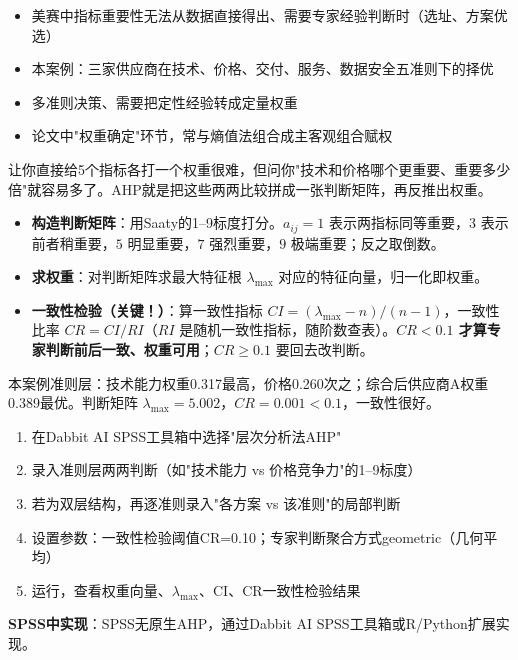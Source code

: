 \begin{algoscene}
\begin{itemize}
    \item 美赛中指标重要性无法从数据直接得出、需要专家经验判断时（选址、方案优选）
    \item 本案例：三家供应商在技术、价格、交付、服务、数据安全五准则下的择优
    \item 多准则决策、需要把定性经验转成定量权重
    \item 论文中"权重确定"环节，常与熵值法组合成主客观组合赋权
\end{itemize}
\end{algoscene}

\begin{algoprinciple}
让你直接给5个指标各打一个权重很难，但问你"技术和价格哪个更重要、重要多少倍"就容易多了。AHP就是把这些两两比较拼成一张判断矩阵，再反推出权重。

\begin{itemize}
    \item \textbf{构造判断矩阵}：用Saaty的1--9标度打分。$a_{ij}=1$ 表示两指标同等重要，$3$ 表示前者稍重要，$5$ 明显重要，$7$ 强烈重要，$9$ 极端重要；反之取倒数。
    \item \textbf{求权重}：对判断矩阵求最大特征根 $\lambda_{\max}$ 对应的特征向量，归一化即权重。
    \item \textbf{一致性检验（关键！）}：算一致性指标 $CI=(\lambda_{\max}-n)/(n-1)$，一致性比率 $CR=CI/RI$（$RI$ 是随机一致性指标，随阶数查表）。\textbf{$CR<0.1$ 才算专家判断前后一致、权重可用}；$CR\geq0.1$ 要回去改判断。
\end{itemize}

本案例准则层：技术能力权重0.317最高，价格0.260次之；综合后供应商A权重0.389最优。判断矩阵 $\lambda_{\max}=5.002$，$CR=0.001<0.1$，一致性很好。
\end{algoprinciple}

\begin{algosposs}
\begin{enumerate}
    \item 在Dabbit AI SPSS工具箱中选择"层次分析法AHP"
    \item 录入准则层两两判断（如"技术能力 vs 价格竞争力"的1--9标度）
    \item 若为双层结构，再逐准则录入"各方案 vs 该准则"的局部判断
    \item 设置参数：一致性检验阈值CR=0.10；专家判断聚合方式geometric（几何平均）
    \item 运行，查看权重向量、$\lambda_{\max}$、CI、CR一致性检验结果
\end{enumerate}

\textbf{SPSS中实现}：SPSS无原生AHP，通过Dabbit AI SPSS工具箱或R/Python扩展实现。
\end{algosposs}


